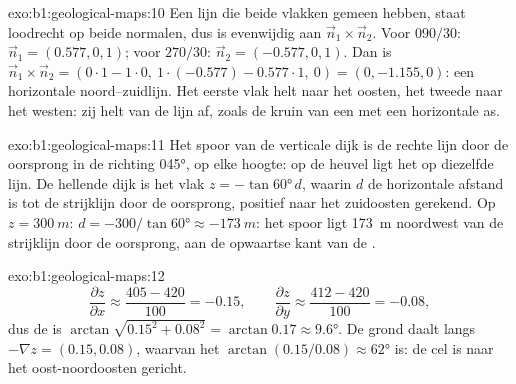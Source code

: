 \begin{solution}{exo:b1:geological-maps:10}
Een lijn die beide vlakken gemeen hebben, staat loodrecht op beide normalen, dus is evenwijdig aan
$\vec n_1 \times \vec n_2$. Voor $090/30$: $\vec n_1 = (0.577, 0,
1)$; voor $270/30$: $\vec n_2 = (-0.577, 0, 1)$. Dan is $\vec n_1 \times \vec n_2
= (0\cdot 1 - 1\cdot 0,\ 1\cdot(-0.577) - 0.577\cdot 1,\ 0) = (0, -1.155,
0)$: een horizontale noord--zuidlijn. Het eerste vlak helt naar het oosten, het tweede naar het
westen: zij helt van de lijn af, zoals de kruin van een  met een horizontale as.
\end{solution}

\begin{solution}{exo:b1:geological-maps:11}
Het spoor van de verticale dijk is de rechte lijn door de oorsprong in de richting \ang{045}, op elke
hoogte: op de heuvel ligt het op diezelfde lijn. De hellende dijk is het vlak $z = -\tan\ang{60}\,d$, waarin
$d$ de horizontale afstand is tot de strijklijn door de oorsprong, positief naar het zuidoosten gerekend.
Op $z = \qty{300}{m}$: $d = -300/\tan\ang{60}
\approx \qty{-173}{m}$: het spoor ligt \qty{173}{m} noordwest van de strijklijn door de oorsprong,
aan de opwaartse kant van de .
\end{solution}

\begin{solution}{exo:b1:geological-maps:12}
\[
  \frac{\partial z}{\partial x} \approx \frac{405 - 420}{100} = -0.15, \qquad
  \frac{\partial z}{\partial y} \approx \frac{412 - 420}{100} = -0.08,
\]
dus de  is $\arctan\sqrt{0.15^2 + 0.08^2} = \arctan 0.17 \approx
\ang{9.6}$. De grond daalt langs $-\nabla z = (0.15, 0.08)$, waarvan het 
$\arctan(0.15/0.08) \approx \ang{62}$ is: de cel is naar het oost-noordoosten gericht.
\end{solution}


